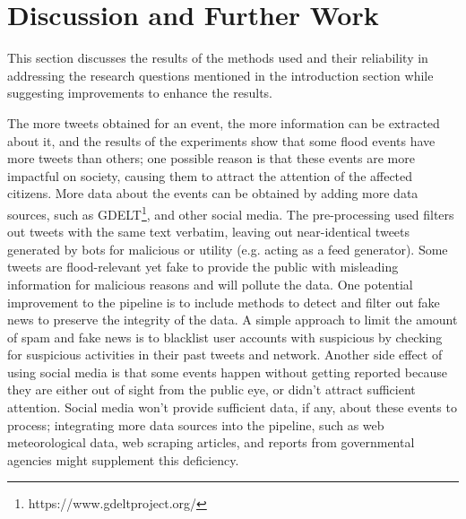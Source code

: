 \chapter{Discussion and Further Work}\label{sec:discussion_and_further_work}
This section discusses the results of the methods used and their reliability in addressing the
research questions mentioned in the introduction section while suggesting improvements to enhance
the results.

The more tweets obtained for an event, the more information can be extracted about it, and the
results of the experiments show that some flood events have more tweets than others; one possible
reason is that these events are more impactful on society, causing them to attract the attention of
the affected citizens. More data about the events can be obtained by adding more data sources, such
as \ac{GDELT}\footnote{https://www.gdeltproject.org/}, and other social media. The pre-processing
used filters out tweets with the same text verbatim, leaving out near-identical tweets generated by
bots for malicious or utility (e.g. acting as a feed generator). Some tweets are flood-relevant yet
fake to provide the public with misleading information for malicious reasons and will pollute the
data. One potential improvement to the pipeline is to include methods to detect and filter out fake
news to preserve the integrity of the data. A simple approach to limit the amount of spam and fake
news is to blacklist user accounts with suspicious by checking for suspicious activities in their
past tweets and network. Another side effect of using social media is that some events happen
without getting reported because they are either out of sight from the public eye, or didn't attract
sufficient attention. Social media won't provide sufficient data, if any, about these events to
process; integrating more data sources into the pipeline, such as web meteorological data, web
scraping articles, and reports from governmental agencies might supplement this deficiency.

